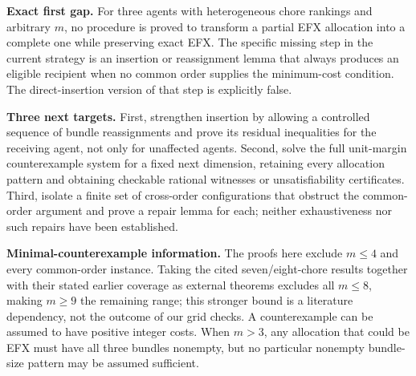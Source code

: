 \documentclass[11pt,a4paper]{article}
\theoremstyle{definition}\newtheorem{definition}[theorem]{Definition}
\theoremstyle{remark}\newtheorem{remark}[theorem]{Remark}
\newcommand{\1}{\mathbf 1}
\begin{document}
\textbf{Exact first gap.} For three agents with heterogeneous chore rankings and arbitrary $m$, no procedure is proved to transform a partial EFX allocation into a complete one while preserving exact EFX. The specific missing step in the current strategy is an insertion or reassignment lemma that always produces an eligible recipient when no common order supplies the minimum-cost condition. The direct-insertion version of that step is explicitly false.

\textbf{Three next targets.} First, strengthen insertion by allowing a controlled sequence of bundle reassignments and prove its residual inequalities for the receiving agent, not only for unaffected agents. Second, solve the full unit-margin counterexample system for a fixed next dimension, retaining every allocation pattern and obtaining checkable rational witnesses or unsatisfiability certificates. Third, isolate a finite set of cross-order configurations that obstruct the common-order argument and prove a repair lemma for each; neither exhaustiveness nor such repairs have been established.

\textbf{Minimal-counterexample information.} The proofs here exclude $m\le4$ and every common-order instance. Taking the cited seven/eight-chore results together with their stated earlier coverage as external theorems excludes all $m\le8$, making $m\ge9$ the remaining range; this stronger bound is a literature dependency, not the outcome of our grid checks. A counterexample can be assumed to have positive integer costs. When $m>3$, any allocation that could be EFX must have all three bundles nonempty, but no particular nonempty bundle-size pattern may be assumed sufficient.
\end{document}
